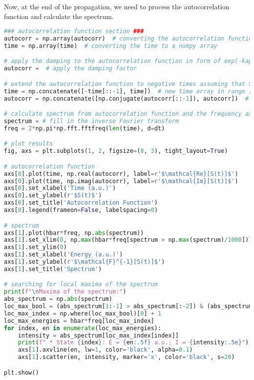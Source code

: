 Now, at the end of the propagation, we need to process the autocorrelation function and calculate the spectrum. 
\begin{lstlisting}[language=Python, style=mystyle2]
### autocorrelation function section ###
autocorr = np.array(autocorr)  # converting the autocorrelation function to a numpy array
time = np.array(time)  # converting the time to a numpy array

# apply the damping to the autocorrelation function in form of exp(-kappa*time)
autocorr =  # apply the damping factor

# extend the autocorrelation function to negative times assuming that S(t) = S^*(-t)
time = np.concatenate([-time[::-1], time])  # new time array in range [-t_max, t_max]
autocorr = np.concatenate([np.conjugate(autocorr[::-1]), autocorr])  # new symmetric autocorr in range [-t_max, t_max]

# calculate spectrum from autocorrelation function and the frequency axis corresponding to it
spectrum = # fill in the inverse Fourier transform
freq = 2*np.pi*np.fft.fftfreq(len(time), d=dt)

# plot results
fig, axs = plt.subplots(1, 2, figsize=(8, 3), tight_layout=True)

# autocorrelation function
axs[0].plot(time, np.real(autocorr), label=r'$\mathcal{Re}[S(t)]$')
axs[0].plot(time, np.imag(autocorr), label=r'$\mathcal{Im}[S(t)]$')
axs[0].set_xlabel('Time (a.u.)')
axs[0].set_ylabel(r'$S(t)$')
axs[0].set_title('Autocorrelation Function')
axs[0].legend(frameon=False, labelspacing=0)

# spectrum
axs[1].plot(hbar*freq, np.abs(spectrum))
axs[1].set_xlim(0, np.max(hbar*freq[spectrum > np.max(spectrum)/1000]))
axs[1].set_ylim(0)
axs[1].set_xlabel('Energy (a.u.)')
axs[1].set_ylabel(r'$\mathcal{F}^{-1}[S(t)]$')
axs[1].set_title('Spectrum')

# searching for local maxima of the spectrum
print(f"\nMaxima of the spectrum:")
abs_spectrum = np.abs(spectrum)
loc_max_bool = (abs_spectrum[1:-1] > abs_spectrum[:-2]) & (abs_spectrum[1:-1] > abs_spectrum[2:])
loc_max_index = np.where(loc_max_bool)[0] + 1
loc_max_energies = hbar*freq[loc_max_index]
for index, en in enumerate(loc_max_energies):
    intensity = abs_spectrum[loc_max_index[index]]
    print(f" * State {index}: E = {en:.5f} a.u.; I = {intensity:.5e}")
    axs[1].axvline(en, lw=1, color='black', alpha=0.1)
    axs[1].scatter(en, intensity, marker='x', color='black', s=20)

plt.show()
\end{lstlisting}

